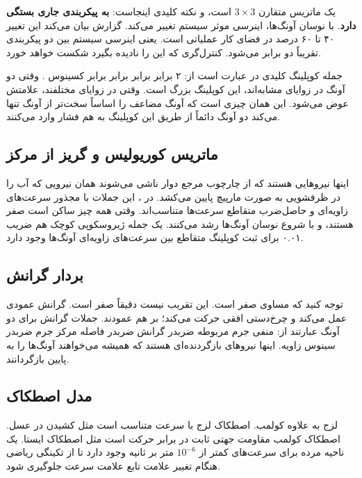 \documentclass[12pt, a4paper]{article}
\newcommand{\dash}{\lr{---}}
\begin{document}
يک ماتريس متقارن $3\times3$ است، و نکته کليدی اينجاست: \textbf{به پيکربندی جاری بستگی دارد}. با نوسان آونگ‌ها، اينرسی موثر سيستم تغيير می‌کند. گزارش بيان می‌کند اين تغيير ۴۰ تا ۶۰ درصد در فضای کار عملياتی است. يعنی اينرسی سيستم بين دو پيکربندی تقريباً دو برابر می‌شود. کنترل‌گری که اين را ناديده بگيرد شکست خواهد خورد.

جمله کوپلينگ کليدی در  عبارت است از: ۲ برابر  برابر  برابر  برابر کسينوس . وقتی دو آونگ در زوايای مشابه‌اند، اين کوپلينگ بزرگ است. وقتی در زوايای مختلفند، علامتش عوض می‌شود. اين همان چيزی است که آونگ مضاعف را اساساً سخت‌تر از آونگ تنها می‌کند \dash{} دو آونگ دائماً از طريق اين کوپلينگ به هم فشار وارد می‌کنند.

\subsection{ماتريس کوريولیس و گريز از مرکز}

اينها نيروهایی هستند که از چارچوب مرجع دوار ناشی می‌شوند \dash{} همان نيرويی که آب را در ظرفشويی به صورت مارپيچ پايين می‌کشد. در ، اين جملات با مجذور سرعت‌های زاويه‌ای و حاصل‌ضرب متقاطع سرعت‌ها متناسب‌اند. وقتی همه چيز ساکن است صفر هستند، و با شروع نوسان آونگ‌ها رشد می‌کنند. يک جمله ژيروسکوپی کوچک هم \dash{} ضريب ۰.۰۱ \dash{} برای ثبت کوپلينگ متقاطع بين سرعت‌های زاويه‌ای آونگ‌ها وجود دارد.

\subsection{بردار گرانش}

توجه کنيد که  مساوی صفر است. اين تقريب نيست \dash{} دقيقاً صفر است. گرانش عمودی عمل می‌کند و چرخ‌دستی افقی حرکت می‌کند؛ بر هم عمودند. جملات گرانش برای دو آونگ عبارتند از: منفی جرم مربوطه ضربدر گرانش ضربدر فاصله مرکز جرم ضربدر سينوس زاويه. اينها نيروهای بازگردنده‌ای هستند که هميشه می‌خواهند آونگ‌ها را به پايين بازگردانند.

\subsection{مدل اصطکاک}

لزج به علاوه کولمب. اصطکاک لزج با سرعت متناسب است \dash{} مثل کشيدن در عسل. اصطکاک کولمب مقاومت جهتی ثابت در برابر حرکت است \dash{} مثل اصطکاک ايستا. يک ناحيه مرده برای سرعت‌های کمتر از $10^{-6}$ متر بر ثانيه وجود دارد تا از تکينگی رياضی هنگام تغيير علامت تابع علامت سرعت جلوگيری شود.
\end{document}
